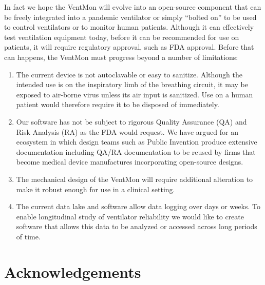 \documentclass[11pt, letterpaper]{article}
\begin{document}
In fact we hope the VentMon will evolve into an open-source component that can be freely integrated into a pandemic ventilator or simply ``bolted on'' to be used to control ventilators or to monitor human patients. Although it can effectively test ventilation equipment today, before it can be recommended for use on patients, it will require regulatory approval, such as FDA approval. Before that can happens, the VentMon must progress beyond a number of limitations:
\begin{enumerate}
\item The current device is not autoclavable or easy to sanitize. Although the intended use is on the
  inspiratory limb of the breathing circuit, it may be exposed to air-borne virus unless its air input
  is sanitized. Use on a human patient would therefore require it to be disposed of immediately.
\item Our software has not be subject to rigorous Quality Assurance (QA) and Risk Analysis (RA) as the FDA would request. We have argued\cite{ecosystem} for an ecosystem in which design teams such as Public Invention produce extensive documentation including  QA/RA documentation to be reused by firms that become medical device manufactures incorporating open-source designs.
\item The mechanical design of the VentMon will require additional alteration to make it robust enough for use in a clinical setting.
\item The current data lake and software allow data  logging over days or weeks. To enable longitudinal study of ventilator reliability we would like to create software that allows this data to be analyzed or accessed across long periods of time.
\end{enumerate}



\section{Acknowledgements}
\end{document}

